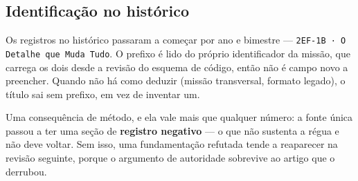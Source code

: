 \documentclass[11pt,a4paper]{article}
\newcommand{\cod}[1]{\texttt{\small #1}}
\begin{document}
\subsection{Identificação no histórico}

Os registros no histórico passaram a começar por ano e bimestre --- \cod{2EF-1B · O Detalhe que Muda
Tudo}. O prefixo é lido do próprio identificador da missão, que carrega os dois desde a revisão do
esquema de código, então não é campo novo a preencher. Quando não há como deduzir (missão
transversal, formato legado), o título sai sem prefixo, em vez de inventar um.

\noindent
Uma consequência de método, e ela vale mais que qualquer número: a fonte única passou a ter uma
seção de \textbf{registro negativo} --- o que não sustenta a régua e não deve voltar. Sem isso, uma
fundamentação refutada tende a reaparecer na revisão seguinte, porque o argumento de autoridade
sobrevive ao artigo que o derrubou.
\end{document}
